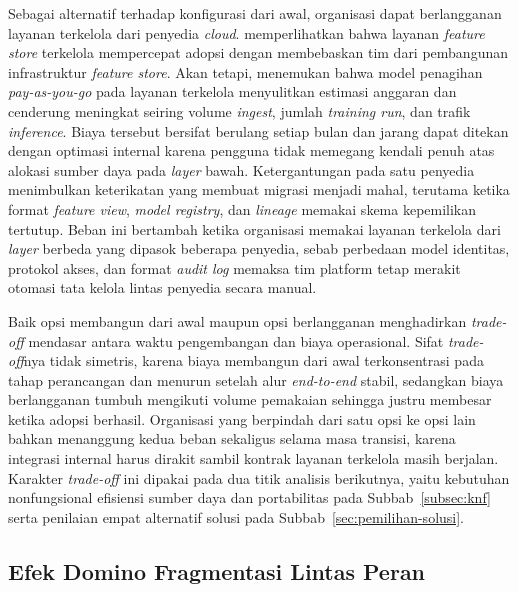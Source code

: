 Sebagai alternatif terhadap konfigurasi dari awal, organisasi dapat berlangganan layanan terkelola dari penyedia \textit{cloud}. \textcite{li2023managed} memperlihatkan bahwa layanan \textit{feature store} terkelola mempercepat adopsi dengan membebaskan tim dari pembangunan infrastruktur \textit{feature store}. Akan tetapi, \textcite{hamza2024serverlesscost} menemukan bahwa model penagihan \textit{pay-as-you-go} pada layanan terkelola menyulitkan estimasi anggaran dan cenderung meningkat seiring volume \textit{ingest}, jumlah \textit{training run}, dan trafik \textit{inference}. Biaya tersebut bersifat berulang setiap bulan dan jarang dapat ditekan dengan optimasi internal karena pengguna tidak memegang kendali penuh atas alokasi sumber daya pada \textit{layer} bawah. Ketergantungan pada satu penyedia menimbulkan keterikatan yang membuat migrasi menjadi mahal, terutama ketika format \textit{feature view}, \textit{model registry}, dan \textit{lineage} memakai skema kepemilikan tertutup. Beban ini bertambah ketika organisasi memakai layanan terkelola dari \textit{layer} berbeda yang dipasok beberapa penyedia, sebab perbedaan model identitas, protokol akses, dan format \textit{audit log} memaksa tim platform tetap merakit otomasi tata kelola lintas penyedia secara manual.

Baik opsi membangun dari awal maupun opsi berlangganan menghadirkan \textit{trade-off} mendasar antara waktu pengembangan dan biaya operasional. Sifat \textit{trade-off}nya tidak simetris, karena biaya membangun dari awal terkonsentrasi pada tahap perancangan dan menurun setelah alur \textit{end-to-end} stabil, sedangkan biaya berlangganan tumbuh mengikuti volume pemakaian sehingga justru membesar ketika adopsi berhasil. Organisasi yang berpindah dari satu opsi ke opsi lain bahkan menanggung kedua beban sekaligus selama masa transisi, karena integrasi internal harus dirakit sambil kontrak layanan terkelola masih berjalan. Karakter \textit{trade-off} ini dipakai pada dua titik analisis berikutnya, yaitu kebutuhan nonfungsional efisiensi sumber daya dan portabilitas pada Subbab~\ref{subsec:knf} serta penilaian empat alternatif solusi pada Subbab~\ref{sec:pemilihan-solusi}.

\subsection{Efek Domino Fragmentasi Lintas Peran}
\label{subsec:efek-domino-fragmentasi}


